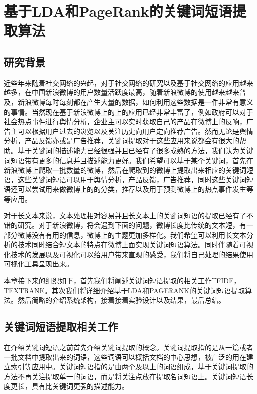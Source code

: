 \documentclass[master]{njuthesis}
\begin{document}
\chapter{基于LDA和PageRank的关键词短语提取算法}\label{chapter_smallworld}
\section{研究背景}

    近些年来随着社交网络的兴起，对于社交网络的研究以及基于社交网络的应用越来越多，在中国新浪微博的用户数量活跃度最高，随着新浪微博的使用越来越来普及，新浪微博每时每刻都在产生大量的数据，如何利用这些数据是一件非常有意义的事情。当然现在基于新浪微博上的上的应用已经非常丰富了，例如政府可以对于社会热点事件进行舆情分析，企业主可以实时获取自己的产品在微博上的反响，广告主可以根据用户过去的浏览以及关注历史向用户定向推荐广告。然而无论是舆情分析，产品反馈亦或是广告推荐，关键词提取对于这些应用来说都会有很大的帮助。基于关键词的描述能力已经很强并且已经有了很多成熟的方法，我们认为关键词短语带有更多的信息并且描述能力更好。我们希望可以基于某个关键词，首先在新浪微博上爬取一批数量的微博，然后在爬取到的微博上提取出来相应的关键词短语，这些关键词短语可以用于舆情分析，产品反馈，广告推荐，同时这些关键词短语还可以尝试用来做微博上的的分类，推荐以及用于预测微博上的热点事件发生等等应用。

    对于长文本来说，文本处理相对容易并且长文本上的关键词短语的提取已经有了不错的研究。对于新浪微博，将会遇到下面的问题，微博长度比传统的文本短，有一部分微博没有有用的信息，微博上的主题更加多样化。我们希望可以利用长文本分析的技术同时结合短文本的特点在微博上面实现关键词短语算法。同时伴随着可视化技术的发展以及可视化可以给用户带来直观的感受，我们将自己处理的结果使用可视化工具呈现出来。

    本章接下来的组织如下，首先我们将阐述关键词短语提取的相关工作TFIDF，TEXTRANK。其次我们将详细介绍基于LDA和PAGERANK的关键词短语提取算法。然后简略的介绍系统架构，接着接着实验设计以及结果，最后总结。

\section{关键词短语提取相关工作}

    在介绍关键词短语之前首先介绍关键词提取的概念。关键词提取指的是从一篇或者一批文档中提取出来的词语，这些词语可以概括文档的中心思想，被广泛的用在建立索引等应用中。关键词短语指的是由两个及以上的词语组成，基于关键词提取的方法不再关注提取单一的词语，而是将关注点放在提取名词短语上。关键词短语长度更长，具有比关键词更强的描述能力。
\end{document}
